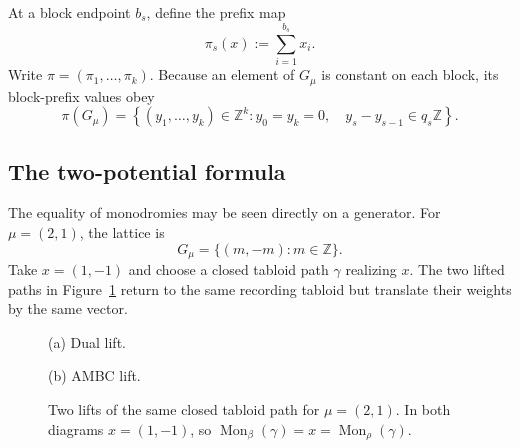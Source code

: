 \documentclass[11pt]{article}
\theoremstyle{definition}
\theoremstyle{remark}
\newcommand{\Z}{\mathbb Z}
\begin{document}
At a block endpoint \(b_s\), define the prefix map
\begin{equation}\label{eq:prefix-map}
                         \pi_s(x):=\sum_{i=1}^{b_s}x_i.
\end{equation}
Write \(\pi=(\pi_1,\ldots,\pi_k)\).  Because an element of \(G_\mu\) is constant on
each block, its block-prefix values obey
\begin{equation}\label{eq:prefix-lattice}
 \pi(G_\mu)=
 \left\{(y_1,\ldots,y_k)\in\Z^k:
 y_0=y_k=0,\quad y_s-y_{s-1}\in q_s\Z\right\}.
\end{equation}

\subsection{The two-potential formula}

The equality of monodromies may be seen directly on a generator.  For
\(\mu=(2,1)\), the lattice is
\[
 G_\mu=\{(m,-m):m\in\Z\}.
\]
Take \(x=(1,-1)\) and choose a closed tabloid path \(\gamma\) realizing \(x\).
The two lifted paths in Figure~\ref{fig:monodromy-equality} return to the same recording
tabloid but translate their weights by the same vector.

\begin{figure}[htbp]
\centering
\begin{minipage}[t]{0.47\textwidth}
\centering
{}

\smallskip
\small (a) Dual lift.
\end{minipage}\hfill
\begin{minipage}[t]{0.47\textwidth}
\centering
{}

\smallskip
\small (b) AMBC lift.
\end{minipage}
\caption{Two lifts of the same closed tabloid path for
\(\mu=(2,1)\).  In both diagrams \(x=(1,-1)\), so
\(\operatorname{Mon}_\beta(\gamma)=x=\operatorname{Mon}_\rho(\gamma)\).}
\label{fig:monodromy-equality}
\end{figure}
\end{document}
